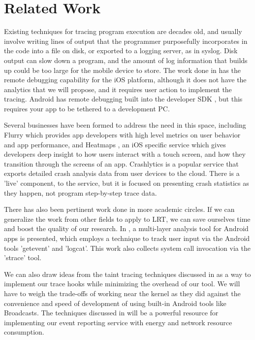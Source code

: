 \documentclass[11pt]{article}
\begin{document}
\section{Related Work} 
Existing techniques for tracing program execution are decades old, and usually 
involve writing lines of output that the programmer purposefully incorporates 
in the code into a file on disk, or exported to a logging server, as in syslog. 
Disk output can slow down a program, and the amount of log information that 
builds up could be too large for the mobile device to store. The work done in 
\cite{NSLogger} has the remote debugging capability for the iOS platform, although 
it does not have the analytics that we will propose, and it requires user action 
to implement the tracing. Android has remote debugging built into the developer 
SDK \cite{AndroidRemoteDebugTool}, but this requires your app to be tethered to a development PC.

Several businesses have been formed to address the need in this space, including
Flurry \cite{Flurry} which provides app developers with high level metrics on
user behavior and app performance, and Heatmaps \cite{Heatmaps}, an iOS specific
service which gives developers deep insight to how users interact with a touch
screen, and how they transition through the screens of an app. 
Crashlytics \cite{Crashlytics} is a popular service that exports detailed
crash analysis data from user devices to the cloud. There is a 'live' component,
to the service, but it is focused on presenting crash statistics as they happen,
not program step-by-step trace data.

There has also been pertinent work done in more academic circles. If we can 
generalize the work from other fields to apply to LRT, we can save ourselves 
time and boost the quality of our research. In \cite{ProfileDroid}, a 
multi-layer analysis tool for Android apps is presented, which employs a 
technique to track user input via the Android tools 'getevent' and 'logcat'. 
This work also collects system call invocation via the 'strace' tool. 

We can also draw ideas from the taint tracing techniques discussed in 
\cite{TaintDroid} as a way to implement our trace hooks while minimizing 
the overhead of our tool. We will have to weigh the trade-offs of working 
near the kernel as they did against the convenience and speed of development 
of using built-in Android tools like Broadcasts.  
The techniques discussed in \cite{PeriodicTransfers} will be a 
powerful resource for implementing our 
event reporting service with energy and network resource consumption.
\end{document}
